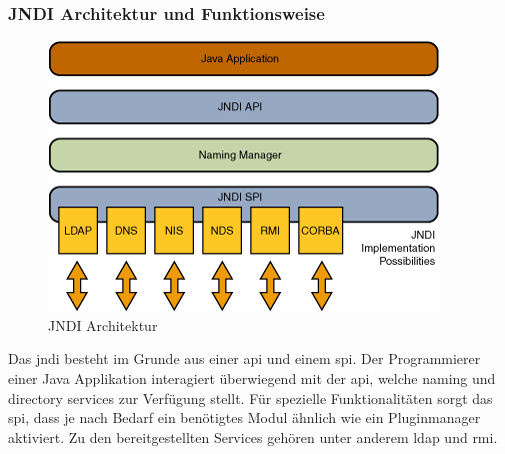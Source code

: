 \subsubsection{JNDI Architektur und Funktionsweise}
\newline
\begin{figure}[!htb] %
    \begin{center}
        \includegraphics[scale=0.75]{images/jndiarch}
    \end{center}
    \caption{JNDI Architektur}
\end{figure}
\newline\newline
Das \gls{jndi} besteht im Grunde aus einer \gls{api} und einem \gls{spi}. Der Programmierer einer Java Applikation interagiert überwiegend mit der \gls{api}, welche
naming und directory services zur Verfügung stellt. Für spezielle Funktionalitäten sorgt das \gls{spi}, dass je nach Bedarf ein benötigtes Modul ähnlich wie ein Pluginmanager
aktiviert. Zu den bereitgestellten Services gehören unter anderem \gls{ldap} und \gls{rmi}.\\
